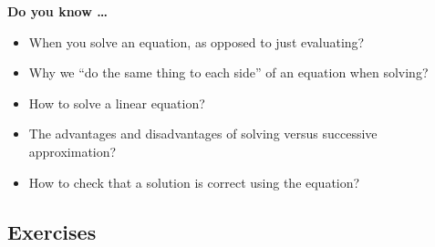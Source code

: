 
 

\noindent \textbf{Do you know \ldots}

\begin{itemize} 
\item When you solve an equation, as opposed to just evaluating?  
\item Why we ``do the same thing to each side'' of an equation when solving? 
\item How to solve a linear equation? 
\item The advantages and disadvantages of solving versus successive approximation? 
\item How to check that a solution is correct using the equation? 

\end{itemize}

\subsection*{Exercises}

